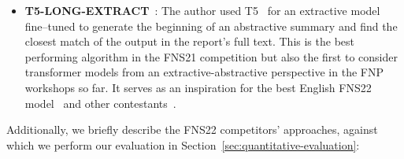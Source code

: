 \begin{itemize}
    \item \textbf{T5-LONG-EXTRACT}~\cite{orzhenovskii-2021-t5}: The author used T5~\cite{rayson2019t5} for an extractive model fine--tuned to generate the beginning of an abstractive summary and find the closest match of the output in the report's full text.
    This is the best performing algorithm in the FNS21 competition but also the first to consider transformer models from an extractive-abstractive perspective in the FNP workshops so far.
    It serves as an inspiration for the best English FNS22 model~\cite{el-haj-etal-2022-financial} and other contestants~\cite{khanna-etal-2022-transformer, foroutan-etal-2022-multilingual}.
\end{itemize}

Additionally, we briefly describe the FNS22 competitors' approaches, against which we perform our evaluation in Section~\ref{sec:quantitative-evaluation}:
